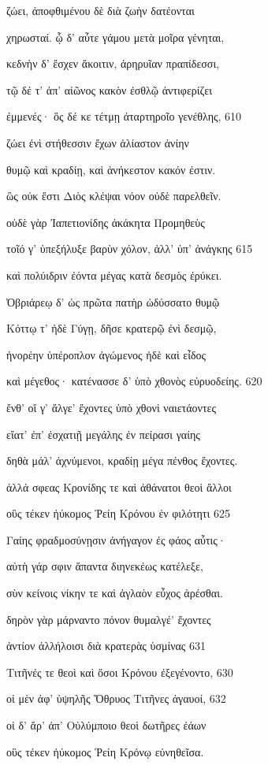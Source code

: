 ζώει, ἀποφθιμένου δὲ διὰ ζωὴν δατέονται

χηρωσταί. ᾧ δ' αὖτε γάμου μετὰ μοῖρα γένηται, 

κεδνὴν δ' ἔσχεν ἄκοιτιν, ἀρηρυῖαν πραπίδεσσι, 

τῷ δέ τ' ἀπ' αἰῶνος κακὸν ἐσθλῷ ἀντιφερίζει

ἐμμενές· ὃς δέ κε τέτμῃ ἀταρτηροῖο γενέθλης, \num{610} 

ζώει ἐνὶ στήθεσσιν ἔχων ἀλίαστον ἀνίην

θυμῷ καὶ κραδίῃ, καὶ ἀνήκεστον κακόν ἐστιν.

ὣς οὐκ ἔστι Διὸς κλέψαι νόον οὐδὲ παρελθεῖν.

οὐδὲ γὰρ Ἰαπετιονίδης ἀκάκητα Προμηθεὺς

τοῖό γ' ὑπεξήλυξε βαρὺν χόλον, ἀλλ' ὑπ' ἀνάγκης \num{615}

καὶ πολύιδριν ἐόντα μέγας κατὰ δεσμὸς ἐρύκει.

Ὀβριάρεῳ δ' ὡς πρῶτα πατὴρ ὠδύσσατο θυμῷ 

Κόττῳ τ' ἠδὲ Γύγῃ, δῆσε κρατερῷ ἐνὶ δεσμῷ, 

ἠνορέην ὑπέροπλον ἀγώμενος ἠδὲ καὶ εἶδος

καὶ μέγεθος· κατένασσε δ' ὑπὸ χθονὸς εὐρυοδείης. \num{620} 

ἔνθ' οἵ γ' ἄλγε' ἔχοντες ὑπὸ χθονὶ ναιετάοντες

εἵατ' ἐπ' ἐσχατιῇ μεγάλης ἐν πείρασι γαίης 

δηθὰ μάλ' ἀχνύμενοι, κραδίῃ μέγα πένθος ἔχοντες.

ἀλλά σφεας Κρονίδης τε καὶ ἀθάνατοι θεοὶ ἄλλοι 

οὓς τέκεν ἠύκομος Ῥείη Κρόνου ἐν φιλότητι \num{625} 

Γαίης φραδμοσύνῃσιν ἀνήγαγον ἐς φάος αὖτις· 

αὐτὴ γάρ σφιν ἅπαντα διηνεκέως κατέλεξε, 

σὺν κείνοις νίκην τε καὶ ἀγλαὸν εὖχος ἀρέσθαι.

δηρὸν γὰρ μάρναντο πόνον θυμαλγέ' ἔχοντες

ἀντίον ἀλλήλοισι διὰ κρατερὰς ὑσμίνας \num{631}   %

Τιτῆνές τε θεοὶ καὶ ὅσοι Κρόνου ἐξεγένοντο, \num{630}

οἱ μὲν ἀφ' ὑψηλῆς Ὄθρυος Τιτῆνες ἀγαυοί, \num{632} 

οἱ δ' ἄρ' ἀπ' Οὐλύμποιο θεοὶ δωτῆρες ἐάων 

οὓς τέκεν ἠύκομος Ῥείη Κρόνῳ εὐνηθεῖσα.

